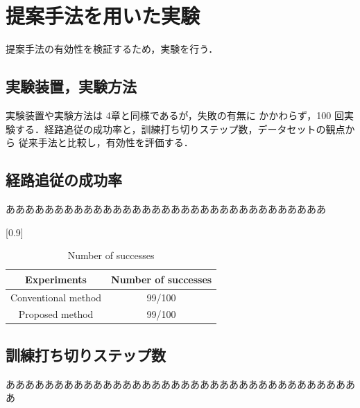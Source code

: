 \documentclass{jarticle}
\begin{document}
\section{提案手法を用いた実験}
提案手法の有効性を検証するため，実験を行う．

\subsection{実験装置，実験方法}
実験装置や実験方法は 4章と同様であるが，失敗の有無に
かかわらず，100 回実験する．経路追従の成功率と，訓練打ち切りステップ数，データセットの観点から
従来手法と比較し，有効性を評価する．

\subsection{経路追従の成功率}
あああああああああああああああああああああああああああああああああ

\begin{table}[h!]
  \centering
  \caption{Number of successes} \vspace*{2mm}
    \scalebox{0.9}[0.9] {
    \begin{tabular}{|c|c|}
      \hline\hline
      Experiments & Number of successes \\
      \hline\hline
      Conventional method & 99/100 \\
      Proposed method & 99/100\\
      \hline 
    \end{tabular} }
\end {table}

\subsection{訓練打ち切りステップ数}
あああああああああああああああああああああああああああああああああああああ
\end{document}
